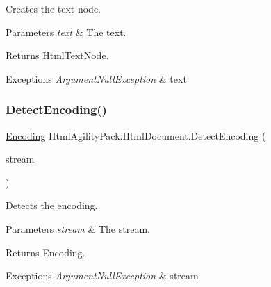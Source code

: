 Creates the text node. 


\begin{DoxyParams}{Parameters}
{\em text} & The text.\\
\hline
\end{DoxyParams}
\begin{DoxyReturn}{Returns}
\hyperlink{class_html_agility_pack_1_1_html_text_node}{Html\+Text\+Node}.
\end{DoxyReturn}

\begin{DoxyExceptions}{Exceptions}
{\em Argument\+Null\+Exception} & text\\
\hline
\end{DoxyExceptions}
\mbox{\label{class_html_agility_pack_1_1_html_document_a0822e4ac2ca2afef5b5906ecfad68f30}} 
\subsubsection{\texorpdfstring{Detect\+Encoding()}{DetectEncoding()}\hspace{0.1cm}{\footnotesize\ttfamily [1/3]}}
{\footnotesize\ttfamily \hyperlink{class_html_agility_pack_1_1_html_document_a220bdf28a5e35f4898075084be2d59f0}{Encoding} Html\+Agility\+Pack.\+Html\+Document.\+Detect\+Encoding (\begin{DoxyParamCaption}\item[{Stream}]{stream }\end{DoxyParamCaption})\hspace{0.3cm}{\ttfamily [inline]}}



Detects the encoding. 


\begin{DoxyParams}{Parameters}
{\em stream} & The stream.\\
\hline
\end{DoxyParams}
\begin{DoxyReturn}{Returns}
Encoding.
\end{DoxyReturn}

\begin{DoxyExceptions}{Exceptions}
{\em Argument\+Null\+Exception} & stream\\
\hline
\end{DoxyExceptions}
\mbox{\label{class_html_agility_pack_1_1_html_document_a714da63e5ce9bd5ebe2ce86e9c2802b4}} 
